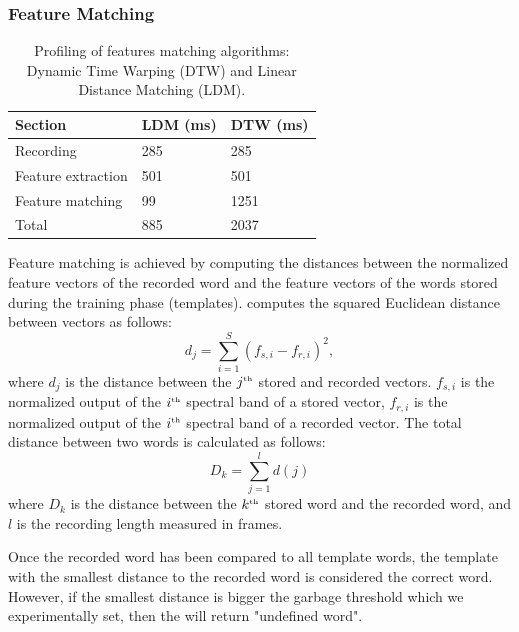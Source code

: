\subsubsection{Feature Matching}
\begin{table}
	\centering
	\caption{Profiling of features matching algorithms: Dynamic Time Warping (DTW) and Linear Distance Matching (LDM).}
	\label{tab:profiling}
	\begin{tabular}{lll} \hline
	Section & LDM (ms) & DTW (ms) \\\hline
	Recording & 285  & 285 \\
	Feature extraction & 501 & 501 \\
	Feature matching &  99 & 1251 \\\hline
	Total & 885 & 2037 \\\hline
	\end{tabular}
\end{table}
%
Feature matching is achieved by computing the distances between the normalized feature vectors of the recorded word and the feature vectors of the words stored during the training phase (templates). 
\cim computes the squared Euclidean distance between vectors as follows:
\begin{equation}
	 	d_j = \sum\limits^S_{i=1} (f_{s,i} - f_{r,i})^2,
    \label{eq:frame_dist}
\end{equation}
where $d_j$ is the distance between the $j^{\text{\tiny th}}$ stored and recorded vectors. $f_{s,i}$ is the normalized output of the $i^{\text{\tiny th}}$ spectral band of a stored vector, $f_{r,i}$ is the normalized output of the $i^{\text{\tiny th}}$ spectral band of a recorded vector. 
The total distance between two words is calculated as follows:
\begin{equation}
		D_k = \sum\limits^{l}_{j=1} d(j)
\end{equation}
where $D_k$ is the distance between the $k^{\text{\tiny th}}$ stored word and the recorded word, and $l$ is the recording length measured in frames.

Once the recorded word has been compared to all \cim template words, the template with the smallest distance to the recorded word is considered the correct word. However, if the smallest distance is bigger the garbage threshold which we experimentally set, then the \cim will return "undefined word". 


